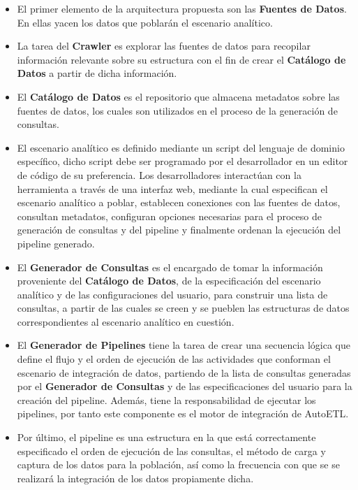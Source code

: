 \begin{itemize}
    \item El primer elemento de la arquitectura propuesta son las \textbf{Fuentes de Datos}. En ellas yacen los 
        datos que poblar\'an el escenario analítico.
    \item La tarea del \textbf{Crawler} es explorar las fuentes de datos para recopilar información relevante sobre su estructura 
        con el fin de crear el \textbf{Catálogo de Datos} a partir de dicha información.
    \item El \textbf{Catálogo de Datos} es el repositorio que almacena metadatos sobre las fuentes de datos, los cuales son 
        utilizados en el proceso de la generación de consultas.
    \item El escenario analítico es definido mediante un script del lenguaje de dominio específico, dicho script debe ser programado por el desarrollador en 
        un editor de código de su preferencia. Los desarrolladores interactúan con la herramienta a través de una interfaz web, mediante la cual especifican el escenario 
        analítico a poblar, establecen conexiones con las fuentes de datos, consultan metadatos, configuran opciones necesarias 
        para el proceso de generación de consultas y del pipeline y finalmente ordenan la ejecución del pipeline generado. 
    \item El \textbf{Generador de Consultas} es el encargado de tomar la información proveniente del \textbf{Catálogo de Datos}, de la especificación
        del escenario analítico y de las configuraciones del usuario, para construir una lista de consultas, a partir de las cuales se creen y se pueblen 
        las estructuras de datos correspondientes al escenario analítico en cuestión.
    \item El \textbf{Generador de Pipelines} tiene la tarea de crear una secuencia lógica que define el flujo y el orden de ejecución de las actividades 
        que conforman el escenario de integración de datos, partiendo 
        de la lista de consultas generadas por el \textbf{Generador de Consultas} y de las especificaciones del usuario para la creación del pipeline. 
        Además, tiene la responsabilidad de ejecutar los pipelines, por tanto este componente es el motor de integración de AutoETL.
    \item Por \'ultimo, el pipeline es una estructura en la que est\'a correctamente especificado el orden de ejecución de las consultas, 
        el método de carga y captura de los datos para la población, así como la frecuencia con que se se realizará la integración de los datos propiamente dicha.
\end{itemize}

